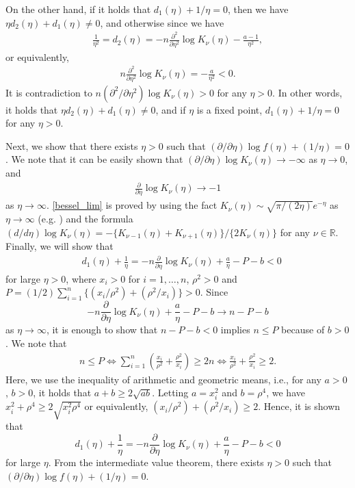 \documentclass[11pt]{article}
\theoremstyle{plain}
\theoremstyle{definition}
\begin{document}
On the other hand, if it holds that $d_{1}(\eta)+1/\eta=0$, then we have $\eta d_{2}(\eta)+d_{1}(\eta)\neq0$, and otherwise since we have
\begin{align*}
\frac{1}{\eta^2}=d_{2}(\eta)=-n\frac{\partial^2}{\partial \eta^2}\log K_{\nu}(\eta)-\frac{a-1}{\eta^2},
\end{align*}
or equivalently,
\begin{align*}
n\frac{\partial^2}{\partial \eta^2}\log K_{\nu}(\eta)=-\frac{a}{\eta^2}<0.
\end{align*}
It is contradiction to $n(\partial^2/\partial \eta^2)\log K_{\nu}(\eta)>0$ for any $\eta>0$. In other words, it holds that $\eta d_{2}(\eta)+d_{1}(\eta)\neq0$, and if $\eta$ is a fixed point, $d_{1}(\eta)+1/\eta=0$ for any $\eta>0$. 

Next, we show that there exists $\eta>0$ such that $(\partial/\partial \eta)\log f(\eta)+(1/\eta)=0$. We note that it can be easily shown that $(\partial/\partial \eta)\log K_{\nu}(\eta)\to -\infty$ as $\eta\to0$, and 
\begin{align}\label{bessel_lim}
\frac{\partial}{\partial \eta}\log K_{\nu}(\eta)\to -1
\end{align}
as $\eta\to\infty$. \eqref{bessel_lim} is proved by using the fact $K_{\nu}(\eta){\sim}\sqrt{\pi/(2\eta)}e^{-\eta}$ as $\eta\to\infty$ (e.g. \cite{AS65}) and the formula $(d/d\eta)\log K_{\nu}(\eta)=-\{K_{\nu-1}(\eta)+K_{\nu+1}(\eta)\}/\{2K_{\nu}(\eta)\}$ for any $\nu \in \mathbb{R}$.  Finally, we will show that 
\begin{align*}
&d_{1}(\eta)+\frac{1}{\eta} =-n\frac{\partial}{\partial \eta}\log K_{\nu}(\eta)+\frac{a}{\eta}-P-b <0
\end{align*}
for large $\eta>0$, where $x_{i}>0$ for $i=1,\dots,n$, $\rho^2>0$ and $P=(1/2)\sum_{i=1}^n \{(x_{i}/\rho^2)+(\rho^2/x_{i})\} >0$. Since
\[-n\frac{\partial}{\partial \eta}\log K_{\nu}(\eta)+\frac{a}{\eta}-P-b\to n-P-b\]
as $\eta \to \infty$, it is enough to show that $n-P-b<0$ implies $n\leq P$ because of $b>0$. We note that
\begin{align*}
n\leq P\iff  \sum_{i=1}^n \left(\frac{x_{i}}{\rho^2}+\frac{\rho^2}{x_{i}}\right)\geq2n\iff \frac{x_{i}}{\rho^2}+\frac{\rho^2}{x_{i}} \geq2.
\end{align*}
Here, we use the inequality of arithmetic and geometric means, i.e., for any $a>0$ , $b>0$, it holds that $a+b\geq2\sqrt{ab}$. Letting $a=x^2_{i}$ and $b=\rho^4$, we have $x^2_{i}+\rho^4\ge 2\sqrt{x_i^2\rho^4}$ or equivalently, 
$(x_{i}/\rho^2)+(\rho^2/x_{i}) \ge 2$. 
Hence, it is shown that
\[d_{1}(\eta)+\frac{1}{\eta} =-n\frac{\partial}{\partial \eta}\log K_{\nu}(\eta)+\frac{a}{\eta}-P-b <0\]
for large $\eta$. From the intermediate value theorem, there exists $\eta>0$ such that $(\partial/\partial \eta)\log f(\eta)+(1/\eta)=0$.
\end{document}
